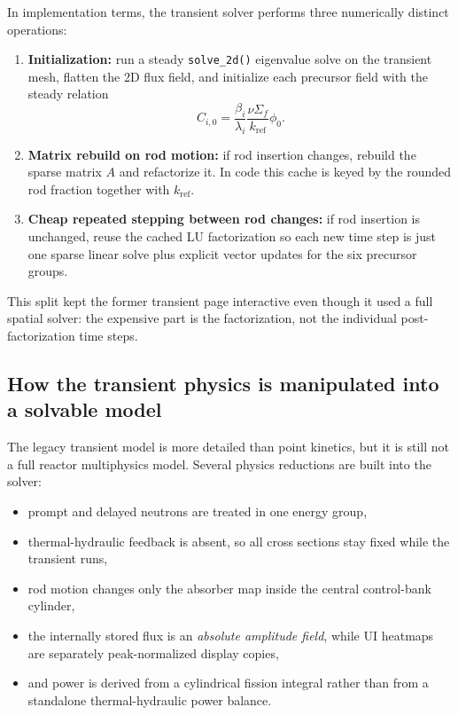 \documentclass[11pt]{article}
\begin{document}
In implementation terms, the transient solver performs three numerically distinct
operations:
\begin{enumerate}
  \item \textbf{Initialization:} run a steady \texttt{solve\_2d()} eigenvalue
        solve on the transient mesh, flatten the 2D flux field, and initialize
        each precursor field with the steady relation
        \[
        C_{i,0} = \frac{\beta_i}{\lambda_i}\frac{\nu\Sigma_f}{k_{\mathrm{ref}}}\phi_0.
        \]
  \item \textbf{Matrix rebuild on rod motion:} if rod insertion changes, rebuild
        the sparse matrix $A$ and refactorize it.  In code this cache is keyed by
        the rounded rod fraction together with $k_{\mathrm{ref}}$.
  \item \textbf{Cheap repeated stepping between rod changes:} if rod insertion is
        unchanged, reuse the cached LU factorization so each new time step is
        just one sparse linear solve plus explicit vector updates for the six
        precursor groups.
\end{enumerate}

This split kept the former transient page interactive even though it used a
full spatial solver: the expensive part is the factorization, not the
individual post-factorization time steps.

\subsection{How the transient physics is manipulated into a solvable model}

The legacy transient model is more detailed than point kinetics, but it is still not a
full reactor multiphysics model.  Several physics reductions are built into the
solver:
\begin{itemize}
  \item prompt and delayed neutrons are treated in one energy group,
  \item thermal-hydraulic feedback is absent, so all cross sections stay fixed
        while the transient runs,
  \item rod motion changes only the absorber map inside the central control-bank
        cylinder,
  \item the internally stored flux is an \emph{absolute amplitude field}, while
        UI heatmaps are separately peak-normalized display copies,
  \item and power is derived from a cylindrical fission integral rather than from
        a standalone thermal-hydraulic power balance.
\end{itemize}
\end{document}
